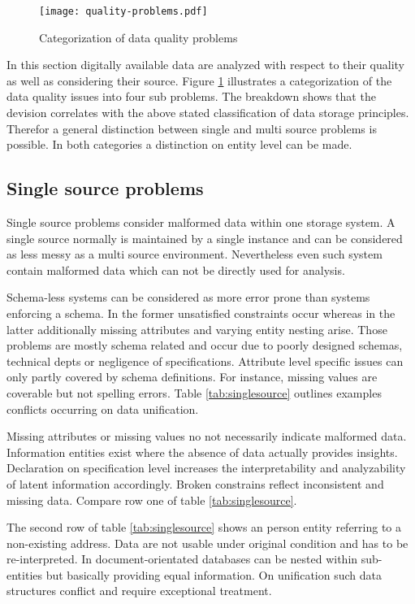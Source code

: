 \begin{figure}[htb]
  \centering
  \texttt{[image: quality-problems.pdf]}\\
  \caption{Categorization of data quality problems}\label{fig:qualityproblems}
\end{figure}

In this section digitally available data are analyzed with respect to their quality as well as considering their source. Figure \ref{fig:qualityproblems} illustrates a categorization of the data quality issues into four sub problems. The breakdown shows that the devision correlates with the above stated classification of data storage principles. Therefor a general distinction between single and multi source problems is possible. In both categories a distinction on entity level can be made. 

\subsection{Single source problems}

Single source problems consider malformed data within one storage system. A single source normally is maintained by a single instance and can be considered as less messy as a multi source environment. Nevertheless even such system contain malformed data which can not be directly used for analysis.

Schema-less systems can be considered as more error prone than systems enforcing a schema. In the former unsatisfied constraints occur whereas in the latter additionally missing attributes and varying entity nesting arise. Those problems are mostly schema related and occur due to poorly designed schemas, technical depts or negligence of specifications. Attribute level specific issues can only partly covered by schema definitions. For instance, missing values are coverable but not spelling errors. Table \ref{tab:singlesource} outlines examples conflicts occurring on data unification. 

Missing attributes or missing values no not necessarily indicate malformed data. Information entities exist where the absence of data actually provides insights. Declaration on specification level increases the interpretability and analyzability of latent information accordingly. Broken constrains reflect inconsistent and missing data. Compare row one of table \ref{tab:singlesource}.

The second row of table \ref{tab:singlesource} shows an person entity referring to a non-existing address. Data are not usable under original condition and has to be re-interpreted. In document-orientated databases can be nested within sub-entities but basically providing equal information. On unification such data structures conflict and require exceptional treatment. 

